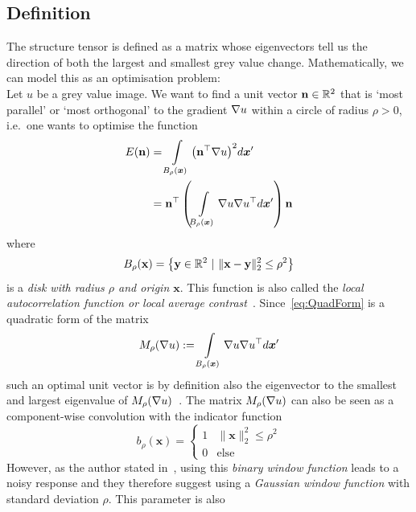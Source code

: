 \subsection{Definition}
The structure tensor is defined as a matrix whose eigenvectors tell us the direction of
both the largest and smallest grey value change. Mathematically, we can model this
as an optimisation problem:\\
Let $u$ be a grey value image.
We want to find a unit vector $\mathbf{n} \in \mathbb{R}^2$ that is `most parallel' or `most orthogonal' to the
gradient $\mathbf{\nabla} u$ within a circle of radius $\rho > 0$, i.e.\ one wants to optimise the
function
\begin{align}
    E(\mathbf{n}) &= \int\limits_{B_\rho(\boldsymbol x)} {\left(\mathbf{n}^\top\mathbf{\nabla}
    u\right)}^2d\boldsymbol x'\\
    &= \mathbf{n}^\top \left(\int\limits_{B_\rho(\boldsymbol x)} \mathbf{\nabla} u \mathbf{\nabla}
        u^\top d\boldsymbol x' \right) \mathbf{n}\label{eq:QuadForm}
\end{align}
where
\begin{equation}
    B_\rho( \mathbf{x} ) = \left\lbrace \mathbf{y}\in\mathbb{R}^2\ \vert\ \lVert \mathbf{x} - \mathbf{y}
    \rVert_2^2 \leq \rho^2 \right\rbrace
\end{equation}
is a \textit{disk with radius $\rho$ and origin $ \mathbf{x}$}.
This function is also called the \textit{local autocorrelation function or local average
    contrast}~\cite{harris88, ipcv}.
Since~\eqref{eq:QuadForm} is a quadratic form of the matrix
\begin{equation}
    M_\rho(\mathbf{\nabla} u) := \int\limits_{B_\rho(\boldsymbol x)} \mathbf{\nabla} u \mathbf{\nabla}
    u^\top d\boldsymbol x'
\end{equation}
such an optimal unit vector is by definition also the eigenvector to the smallest and largest
eigenvalue of $M_\rho(\mathbf{\nabla} u)$~\cite{ipcv}.
The matrix $M_\rho(\mathbf{\nabla} u)$ can also be seen as a component-wise convolution with the indicator
function
\begin{equation}
    b_\rho(\boldsymbol x) = \begin{cases} 1 & \lVert \boldsymbol x\rVert_2^2 \leq \rho^2\\ 0 & \text{else} \end{cases}
\end{equation}
However, as the author stated in~\cite{harris88}, using this \textit{binary window function} leads
to a noisy response and they therefore suggest using a \textit{Gaussian window function} with standard
deviation $\rho$. This parameter is also

